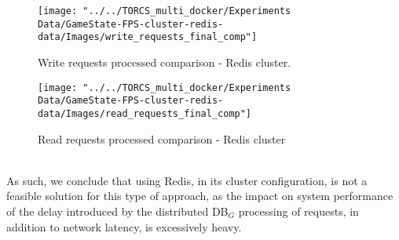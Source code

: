 \begin{figure}[h!]
	\centering
	\texttt{[image: "../../TORCS\_multi\_docker/Experiments Data/GameState-FPS-cluster-redis-data/Images/write\_requests\_final\_comp"]}
	\caption[Write requests processed comparison - Redis cluster]{Write requests processed comparison - Redis cluster.}
	\label{fig:write-requests-comparison-redis-cluster}
\end{figure}
\begin{figure}[h!]
	\centering
	\texttt{[image: "../../TORCS\_multi\_docker/Experiments Data/GameState-FPS-cluster-redis-data/Images/read\_requests\_final\_comp"]}
	\caption[Read requests processed comparison - Redis cluster]{Read requests processed comparison - Redis cluster}
	\label{fig:read-requests-comparison-redis-cluster.}
\end{figure}
\\ As such, we conclude that using Redis, in its cluster configuration, is not a feasible solution for this type of approach, as the impact on system performance of the delay introduced by the distributed DB$_G$ processing of requests, in addition to network latency, is excessively heavy.

